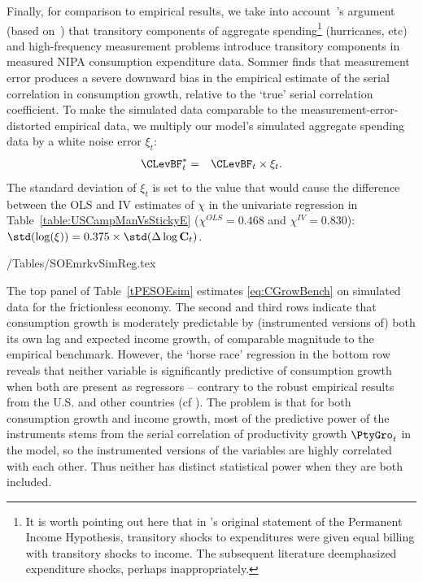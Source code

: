 \documentclass[titlepage]{\econtex}\newcommand{\texname}{cAndCwithStickyE}
\begin{document}
Finally, for comparison to empirical results, we take into account~\cite{som07}'s argument (based on~\cite{wilcox:aer}) that transitory components of aggregate spending\footnote{It is worth pointing out here that in \cite{friedmanATheory}'s original statement of the Permanent Income Hypothesis, transitory shocks to expenditures were given equal billing with transitory shocks to income.  The subsequent literature deemphasized expenditure shocks, perhaps inappropriately.} (hurricanes, etc) and high-frequency measurement problems introduce transitory components in measured NIPA consumption expenditure data.  Sommer finds that measurement error produces a severe downward bias in the empirical estimate of the serial correlation in consumption growth, relative to the `true' serial correlation coefficient.  To make the simulated data comparable to the measurement-error-distorted empirical data, we multiply our model's simulated aggregate spending data by a white noise error $\xi_t$:
 \begin{eqnarray}
{\CLevBF}^*_{t} & = & \CLevBF_{t}\times\xi_{t}.
\end{eqnarray}
The standard deviation of $\xi_t$ is set to the value that would cause the difference between the OLS and IV estimates of $\chi$ in the univariate regression in Table~\ref{table:USCampManVsStickyE} ($\chi^{OLS}=0.468$ and $\chi^{IV}=0.830$): $\std(\log(\xi))= 0.375\times\std(\Delta \log \mathbf{C}_t)$.

\econtexRoot/Tables/SOEmrkvSimReg.tex

The top panel of Table~\ref{tPESOEsim} estimates \eqref{eq:CGrowBench} on simulated data for the frictionless economy.  The second and third rows indicate that consumption growth is moderately predictable by (instrumented versions of) both its own lag and expected income growth, of comparable magnitude to the empirical benchmark.  However, the `horse race' regression in the bottom row reveals that neither variable is significantly predictive of consumption growth when both are present as regressors -- contrary to the robust empirical results from the U.S. and other countries (cf \cite{cssIntlStickyC}).  The problem is that for both consumption growth and income growth, most of the predictive power of the instruments stems from the serial correlation of productivity growth $\PtyGro_t$ in the model, so the instrumented versions of the variables are highly correlated with each other.  Thus neither has distinct statistical power when they are both included.
\end{document}
